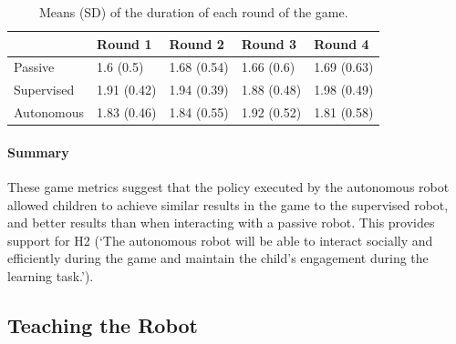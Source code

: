\begin{table}[ht]
	\centering
	\caption{Means (SD) of the duration of each round of the game.}
	\label{tab:tuto_results_time}
	\begin{tabularx}{\textwidth}{@{}L{1.}L{1}L{1}L{1}L{1}@{}}\toprule
		& Round 1 & Round 2 & Round 3 & Round 4\\ 
		\midrule 
		Passive & 1.6 (0.5) & 1.68 (0.54) & 1.66 (0.6) & 1.69 (0.63)\\ 
		Supervised & 1.91 (0.42) & 1.94 (0.39) & 1.88 (0.48) & 1.98 (0.49)\\ 
		Autonomous & 1.83 (0.46) & 1.84 (0.55) & 1.92 (0.52) & 1.81 (0.58)\\ 
		
		\bottomrule
	\end{tabularx}
\end{table}

\paragraph{Summary}

These game metrics suggest that the policy executed by the autonomous robot allowed children to achieve similar results in the game to the supervised robot, and better results than when interacting with a passive robot. This provides support for H2 (`The autonomous robot will be able to interact socially and efficiently during the game and maintain the child's engagement during the learning task.'). 

\subsection{Teaching the Robot}

